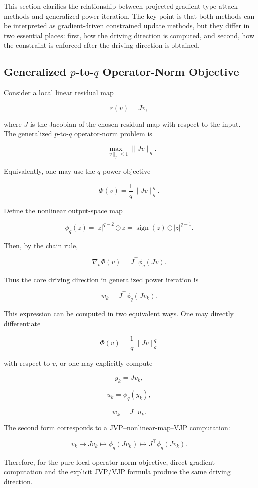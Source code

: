 \documentclass{article}
\begin{document}
This section clarifies the relationship between projected-gradient-type attack methods and generalized power iteration. The key point is that both methods can be interpreted as gradient-driven constrained update methods, but they differ in two essential places: first, how the driving direction is computed, and second, how the constraint is enforced after the driving direction is obtained.

\subsection{Generalized \(p\)-to-\(q\) Operator-Norm Objective}

Consider a local linear residual map

\[
r(v)=Jv,
\]

where \(J\) is the Jacobian of the chosen residual map with respect to the input. The generalized \(p\)-to-\(q\) operator-norm problem is

\[
\max_{\|v\|_p\le 1}\|Jv\|_q.
\]

Equivalently, one may use the \(q\)-power objective

\[
\Phi(v)
=
\frac{1}{q}\|Jv\|_q^q.
\]

Define the nonlinear output-space map

\[
\phi_q(z)
=
|z|^{q-2}\odot z
=
\operatorname{sign}(z)\odot |z|^{q-1}.
\]

Then, by the chain rule,

\[
\nabla_v \Phi(v)
=
J^\top \phi_q(Jv).
\]

Thus the core driving direction in generalized power iteration is

\[
w_k
=
J^\top \phi_q(Jv_k).
\]

This expression can be computed in two equivalent ways. One may directly differentiate

\[
\Phi(v)=\frac{1}{q}\|Jv\|_q^q
\]

with respect to \(v\), or one may explicitly compute

\[
y_k=Jv_k,
\]

\[
u_k=\phi_q(y_k),
\]

\[
w_k=J^\top u_k.
\]

The second form corresponds to a JVP--nonlinear-map--VJP computation:

\[
v_k
\longmapsto
Jv_k
\longmapsto
\phi_q(Jv_k)
\longmapsto
J^\top\phi_q(Jv_k).
\]

Therefore, for the pure local operator-norm objective, direct gradient computation and the explicit JVP/VJP formula produce the same driving direction.
\end{document}
